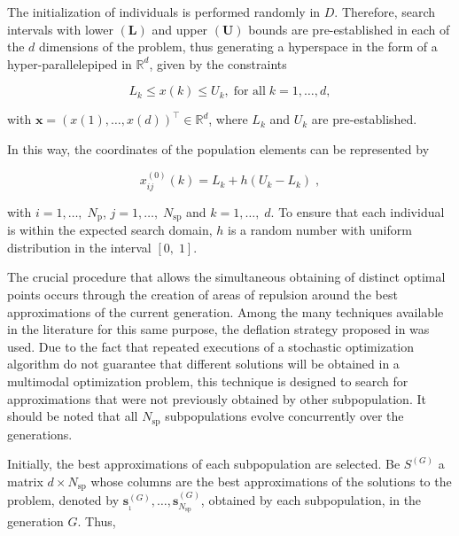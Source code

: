 \documentclass[smallextended]{svjour3}       %
\begin{document}
The initialization of individuals is performed randomly in $D$. Therefore, search intervals with lower $(\boldsymbol{L})$ and upper $(\boldsymbol{U})$ bounds are pre-established in each of the $ d $ dimensions of the problem, thus generating a hyperspace in the form of a hyper-parallelepiped in $\mathbb{R}^{d}$, given by the constraints

\begin{equation}
L_{k} \leq x(k) \leq U_{k}, \; \text{for all} \; k = 1, \dots, d,
\end{equation}

\noindent with $\boldsymbol{x} = (x(1), \dots ,x(d) )^{\top} \in \mathbb{R}^{d}$, where $L_{k}$ and $U_{k}$ are pre-established. 

In this way, the coordinates of the population elements can be represented by

\begin{equation} \label{eq:init_population}
x_{ij}^{\left(0\right)} (k) = L_{k} + h \left( U_{k} - L_{k} \right) \; ,
\end{equation}

\noindent with $i = 1, \dots, \; N_{\text{p}}$, $j = 1, \dots, \; N_{\text{sp}}$ and $k = 1, \dots, \; d$. To ensure that each individual is within the expected search domain, $h$ is a random number with uniform distribution in the interval $\left[ 0, \; 1 \right]$.

The crucial procedure that allows the simultaneous obtaining of distinct optimal points occurs through the creation of areas of repulsion around the best approximations of the current generation. Among the many techniques available in the literature for this same purpose, the deflation strategy proposed in \cite{bib:hirsch2009solving} was used. Due to the fact that repeated executions of a stochastic optimization algorithm do not guarantee that different solutions will be obtained in a multimodal optimization problem, this technique is designed to search for approximations that were not previously obtained by other subpopulation. It should be noted that all $ N_{\text{sp}} $ subpopulations evolve concurrently over the generations.

Initially, the best approximations of each subpopulation are selected. Be $ S^{(G)} $ a matrix $ d \times N_{\text{sp}} $ whose columns are the best approximations of the solutions to the problem, denoted by $ \boldsymbol{s}_{ _{1}} ^{(G)}, \dots, \boldsymbol{s}_{N_{\text{sp}}} ^{(G)} $, obtained by each subpopulation, in the generation $G$. Thus, 
\end{document}
